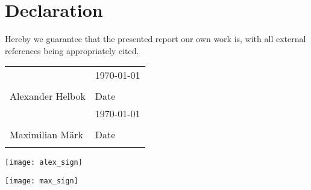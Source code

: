 \section*{Declaration}

Hereby we guarantee that the presented report our own work is, with all external references being appropriately cited.

\begin{tabular}{@{}p{2.5in}p{2.5in}@{}}
	\\[5\bigskipamount]
	& \hspace{2mm}\today \\[-12pt]
	\dotfill & \dotfill \\
	Alexander Helbok & Date \\[5\bigskipamount]
	& \hspace{2mm}\today \\[-12pt]
	\dotfill & \dotfill \\
	Maximilian Märk & Date \\
	\centering
\end{tabular}

\begin{minipage}{0.3\textwidth}
	\vspace{-12cm}
	\texttt{[image: alex\_sign]}
\end{minipage}

\begin{minipage}{0.3\textwidth}
	\vspace{-5.5cm}
	\texttt{[image: max\_sign]}
\end{minipage}
